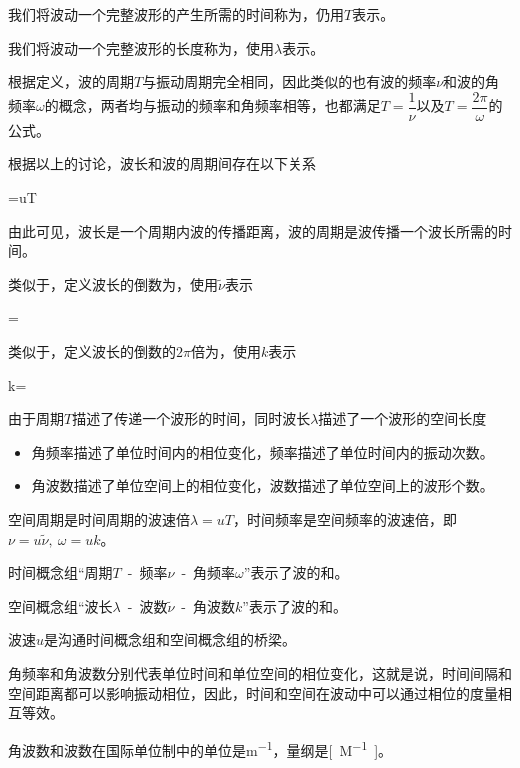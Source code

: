 我们将波动一个完整波形的产生所需的时间称为，仍用$T$表示。

我们将波动一个完整波形的长度称为，使用$\lambda$表示。

根据定义，波的周期$T$与振动周期完全相同，因此类似的也有波的频率$\nu$和波的角频率$\omega$的概念，两者均与振动的频率和角频率相等，也都满足$T=\dfrac{1}{\nu}$以及$T=\dfrac{2\pi}{\omega}$的公式。

根据以上的讨论，波长和波的周期间存在以下关系
\begin{BoxEquation}[波长和周期的关系]
    \lambda=uT
\end{BoxEquation}
由此可见，波长是一个周期内波的传播距离，波的周期是波传播一个波长所需的时间。

类似于，定义波长的倒数为，使用$\widetilde{\nu}$表示
\begin{BoxDefinition}
    \widetilde{\nu}=
\end{BoxDefinition}
类似于，定义波长的倒数的$2\pi$倍为，使用$k$表示
\begin{BoxDefinition}
    k=\frac{2\pi}{\lambda}
\end{BoxDefinition}
由于周期$T$描述了传递一个波形的时间，同时波长$\lambda$描述了一个波形的空间长度
\begin{itemize}
    \item 角频率描述了单位时间内的相位变化，频率描述了单位时间内的振动次数。
    \item 角波数描述了单位空间上的相位变化，波数描述了单位空间上的波形个数。
\end{itemize}
空间周期是时间周期的波速倍$\lambda=uT$，时间频率是空间频率的波速倍，即$\nu=u\widetilde{\nu},~\omega=uk$。

时间概念组“周期$T$~-~频率$\nu$~-~角频率$\omega$”表示了波的和。

空间概念组“波长$\lambda$\hspace{2pt}~-~波数$\widetilde{\nu}$~-~角波数$k$”表示了波的和。

波速$u$是沟通时间概念组和空间概念组的桥梁。

角频率和角波数分别代表单位时间和单位空间的相位变化，这就是说，时间间隔和空间距离都可以影响振动相位，因此，时间和空间在波动中可以通过相位的度量相互等效。

角波数和波数在国际单位制中的单位是\si{m^{-1}}，量纲是\si{[M^{-1}]}。

